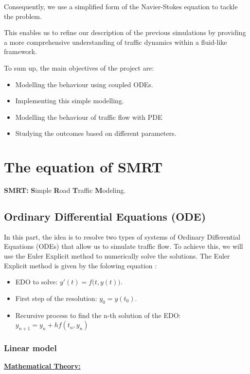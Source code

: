 \documentclass{article}
\begin{document}
	Consequently, we use a simplified form of the Navier-Stokes equation to tackle the problem.
	
	This enables us to refine our description of the previous simulations by providing a more comprehensive understanding of traffic dynamics within a fluid-like framework. \newline\newline
	
	To sum up, the main objectives of the project are: 
	\begin{itemize}
		\item Modelling the behaviour using coupled ODEs.
		\item Implementing this simple modelling.
		\item Modelling the behaviour of traffic flow with PDE
		\item Studying the outcomes based on different parameters.
	\end{itemize}
	
	
	\section{The equation of  SMRT}

    \textbf{SMRT:} \textbf{S}imple \textbf{R}oad \textbf{T}raffic \textbf{M}odeling.


 
		\subsection{Ordinary Differential Equations (ODE) }
		In this part, the idea is to resolve two types of systems of Ordinary Differential Equations (ODEs) that allow us to simulate traffic flow. To achieve this, we will use the Euler Explicit method to numerically solve the solutions.
		The Euler Explicit method is given by the folowing equation :
		\begin{itemize} 
			\item EDO to solve: $\boxed{y'(t) = f{\bigl (}t, y(t){\bigr )}}$.
			\item First step of the resolution: $\boxed{y_0 = y(t_0)}$.
			\item Recursive process to find the n-th solution of the EDO: $\boxed{y_{n+1} = y_{n} + hf(t_{n}, y_{n})}$
		\end{itemize}
		\subsubsection{Linear model}
			\textbf{\underline{Mathematical Theory:}}
			\newline
			
\end{document}
